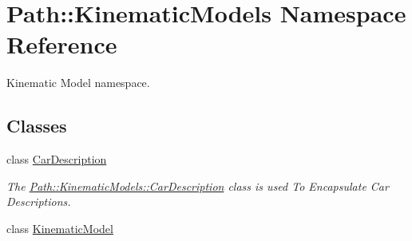 \hypertarget{namespace_path_1_1_kinematic_models}{}\section{Path\+:\+:Kinematic\+Models Namespace Reference}
\label{namespace_path_1_1_kinematic_models}


Kinematic Model namespace.  


\subsection*{Classes}
\begin{DoxyCompactItemize}
\item 
class \hyperlink{class_path_1_1_kinematic_models_1_1_car_description}{Car\+Description}
\begin{DoxyCompactList}\small\item\em The \hyperlink{class_path_1_1_kinematic_models_1_1_car_description}{Path\+::\+Kinematic\+Models\+::\+Car\+Description} class is used To Encapsulate Car Descriptions. \end{DoxyCompactList}\item 
class \hyperlink{class_path_1_1_kinematic_models_1_1_kinematic_model}{Kinematic\+Model}
\end{DoxyCompactItemize}
